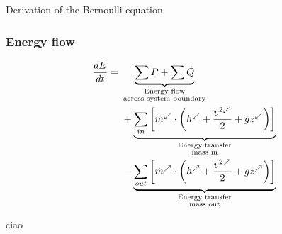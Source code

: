 \documentclass{article}
\begin{document}
\begin{multicols}{2}
\begin{theorybox}{Derivation of the Bernoulli equation}
\subsubsection{Energy flow}
\vspace*{-0.5cm}
    \begin{align}
        \frac{dE}{dt} =\ 
        &\underbrace{\sum P + \sum \dot{Q}}_{
            \substack{
                \text{Energy flow} \\ \text{across system boundary}
            }
        } \notag \\
        &+ \underbrace{\sum_{in} \left[\dot{m}^{\swarrow} \cdot \left(h^{\swarrow} + \frac{v^{2\swarrow}}{2} + g z^{\swarrow}\right)\right]}_{
            \substack{
                \text{Energy transfer} \\ \text{mass in}
            }
        } \notag \\
        &- \underbrace{\sum_{out} \left[\dot{m}^{\nearrow} \cdot \left(h^{\nearrow} + \frac{v^{2\nearrow}}{2} + g z^{\nearrow}\right)\right]}_{
            \substack{
                \text{Energy transfer} \\ \text{mass out}
            }
        }
    \end{align}
\end{theorybox}



\vfill
\columnbreak
ciao

\end{multicols}
\end{document}
